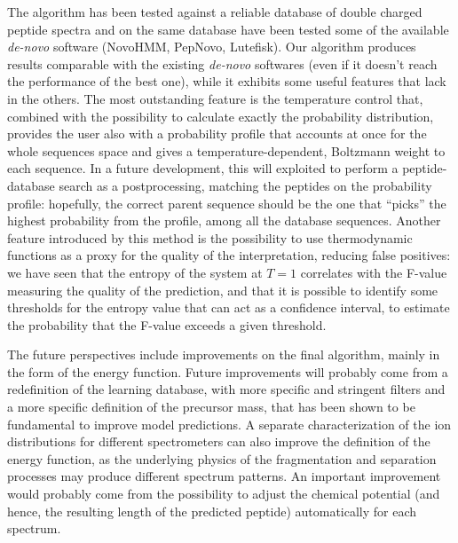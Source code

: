 The algorithm has been tested against a reliable database of double charged
peptide spectra and on the same database have been tested some of the
available \emph{de-novo} software (NovoHMM, PepNovo, Lutefisk).
Our algorithm %
produces results
comparable with the existing {\sl de-novo} softwares (even if it doesn't reach the performance of the best one),  while it exhibits some useful features that lack in the others.
The most outstanding feature is the temperature control that, combined with the
possibility to calculate exactly the probability distribution,  provides the user also with a probability profile that  accounts at once for the whole sequences space and gives a temperature-dependent, Boltzmann weight to each sequence. 
In a future development, this will exploited to perform a peptide-database search as a postprocessing, matching the peptides  on the probability profile: hopefully, the correct parent sequence should  be the one that ``picks'' the highest probability from the profile, among all the database sequences.
Another feature introduced by this method is the possibility to use thermodynamic functions as a proxy for the quality of the interpretation, reducing false positives: we have seen that the entropy of the system at $T=1$ correlates with the F-value measuring the quality of the prediction, and that it is possible to identify some thresholds for the entropy value that can act as a confidence interval, to estimate the probability that the F-value exceeds  a given threshold.

The future perspectives include improvements on the final algorithm, mainly in the form of the energy function.
Future improvements will probably come from a redefinition of the learning database, 
with more specific and stringent filters and a more specific definition of the
precursor mass, that has been shown to be fundamental to improve model
predictions. 
A separate characterization of the ion distributions for different spectrometers
can also improve the definition of the energy function,  
as the underlying physics of the fragmentation and separation processes may produce different spectrum
patterns.
An important improvement would probably  come from the possibility to adjust the chemical potential (and hence, the resulting length of the predicted peptide) automatically for each spectrum.


